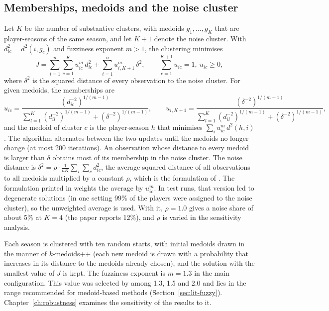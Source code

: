 \subsection{Memberships, medoids and the noise cluster}
\label{sec:method-noise}

Let $K$ be the number of substantive clusters, with medoids $g_1,\dots,g_K$ that are player-seasons of the same season, and let $K+1$ denote the noise cluster. With $d_{ic}^2=d^2(i,g_c)$ and fuzziness exponent $m>1$, the clustering minimises
\begin{equation}
	J=\sum_{i=1}^{n}\sum_{c=1}^{K}u_{ic}^{m}\,d_{ic}^{2}+\sum_{i=1}^{n}u_{i,K+1}^{m}\,\delta^{2},
	\qquad \sum_{c=1}^{K+1}u_{ic}=1,\ u_{ic}\ge 0,
\end{equation}
where $\delta^2$ is the squared distance of every observation to the noise cluster. For given medoids, the memberships are
\begin{equation}
	u_{ic}=\frac{\left(d_{ic}^{-2}\right)^{1/(m-1)}}{\sum_{l=1}^{K}\left(d_{il}^{-2}\right)^{1/(m-1)}+\left(\delta^{-2}\right)^{1/(m-1)}},
	\qquad
	u_{i,K+1}=\frac{\left(\delta^{-2}\right)^{1/(m-1)}}{\sum_{l=1}^{K}\left(d_{il}^{-2}\right)^{1/(m-1)}+\left(\delta^{-2}\right)^{1/(m-1)}},
\end{equation}
and the medoid of cluster $c$ is the player-season $h$ that minimises $\sum_i u_{ic}^{m}\,d^2(h,i)$. The algorithm alternates between the two updates until the medoids no longer change (at most 200 iterations). An observation whose distance to every medoid is larger than $\delta$ obtains most of its membership in the noise cluster. The noise distance is $\delta^{2}=\rho\cdot\frac{1}{nK}\sum_{i}\sum_{c}d_{ic}^{2}$, the average squared distance of all observations to all medoids multiplied by a constant $\rho$, which is the formulation of . The formulation printed in  weights the average by $u_{ic}^m$. In test runs, that version led to degenerate solutions (in one setting 99\% of the players were assigned to the noise cluster), so the unweighted average is used. With it, $\rho=1.0$ gives a noise share of about 5\% at $K=4$ (the paper reports 12\%), and $\rho$ is varied in the sensitivity analysis.

Each season is clustered with ten random starts, with initial medoids drawn in the manner of $k$-medoids++ (each new medoid is drawn with a probability that increases in its distance to the medoids already chosen), and the solution with the smallest value of $J$ is kept. The fuzziness exponent is $m=1.3$ in the main configuration. This value was selected by  among 1.3, 1.5 and 2.0 and lies in the range recommended for medoid-based methods (Section~\ref{sec:lit-fuzzy}). Chapter~\ref{ch:robustness} examines the sensitivity of the results to it.

